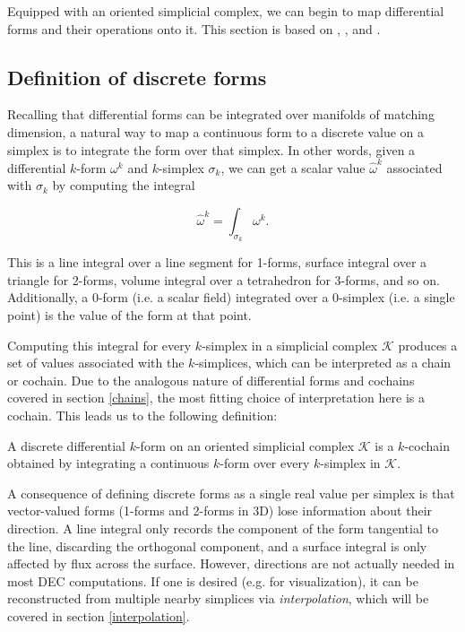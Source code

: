 \documentclass[utf8,english]{gradu3}
\begin{document}
Equipped with an oriented simplicial complex,
we can begin to map differential forms and their operations onto it.
This section is based on \parencite{desbrun_discrete_2006},
\parencite{crane_digital_2013}, and \parencite{blair_perot_differential_2014}.


\subsection{Definition of discrete forms}

Recalling that differential forms can be integrated
over manifolds of matching dimension,
a natural way to map a continuous form to a discrete value on a simplex
is to integrate the form over that simplex.
In other words, given a differential $k$-form $\omega^k$
and $k$-simplex $\sigma_k$, we can get a scalar value $\widehat{\omega}^k$
associated with $\sigma_k$ by computing the integral

\[
  \widehat{\omega}^k = \int_{\sigma_k} \omega^k.
\]

This is a line integral over a line segment for 1-forms,
surface integral over a triangle for 2-forms,
volume integral over a tetrahedron for 3-forms, and so on.
Additionally, a 0-form (i.e. a scalar field)
integrated over a 0-simplex (i.e. a single point)
is the value of the form at that point.

Computing this integral for every $k$-simplex in a simplicial complex $\mathcal{K}$
produces a set of values associated with the $k$-simplices,
which can be interpreted as a chain or cochain.
Due to the analogous nature of differential forms and cochains
covered in section \ref{chains},
the most fitting choice of interpretation here is a cochain.
This leads us to the following definition:

A discrete differential $k$-form on an oriented simplicial complex $\mathcal{K}$
is a $k$-cochain obtained by integrating a continuous $k$-form
over every $k$-simplex in $\mathcal{K}$.

A consequence of defining discrete forms as a single real value per simplex
is that vector-valued forms (1-forms and 2-forms in 3D)
lose information about their direction.
A line integral only records the component of the form tangential to the line,
discarding the orthogonal component,
and a surface integral is only affected by flux across the surface.
However, directions are not actually needed in most DEC computations.
If one is desired (e.g. for visualization),
it can be reconstructed from multiple nearby simplices via \textit{interpolation},
which will be covered in section \ref{interpolation}.
\end{document}
